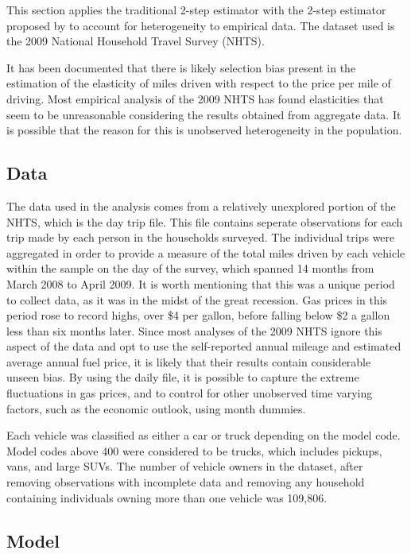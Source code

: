 \documentclass{article}
\begin{document}
This section applies the traditional \citet{heckman1979} 2-step estimator with the 2-step estimator proposed by \citet{reichert2014} to account for heterogeneity to empirical data.  The dataset used is the 2009 National Household Travel Survey (NHTS).  

It has been documented that there is likely selection bias present in the estimation of the elasticity of miles driven with respect to the price per mile of driving.  Most empirical analysis of the 2009 NHTS has found elasticities that seem to be unreasonable considering the results obtained from aggregate data.  It is possible that the reason for this is unobserved heterogeneity in the population.

\subsection{Data}

The data used in the analysis comes from a relatively unexplored portion of the NHTS, which is the day trip file.  This file contains seperate observations for each trip made by each person in the households surveyed.  The individual trips were aggregated in order to provide a measure of the total miles driven by each vehicle within the sample on the day of the survey, which spanned 14 months from March 2008 to April 2009.  It is worth mentioning that this was a unique period to collect data, as it was in the midst of the great recession.  Gas prices in this period rose to record highs, over \$4 per gallon, before falling below \$2 a gallon less than six months later.  Since most analyses of the 2009 NHTS ignore this aspect of the data and opt to use the self-reported annual mileage and estimated average annual fuel price, it is likely that their results contain considerable unseen bias.  By using the daily file, it is possible to capture the extreme fluctuations in gas prices, and to control for other unobserved time varying factors, such as the economic outlook, using month dummies.

Each vehicle was classified as either a car or truck depending on the model code.  Model codes above 400 were considered to be trucks, which includes pickups, vans, and large SUVs.  The number of vehicle owners in the dataset, after removing observations with incomplete data and removing any household containing individuals owning more than one vehicle was 109,806.

\subsection{Model}
\end{document}
